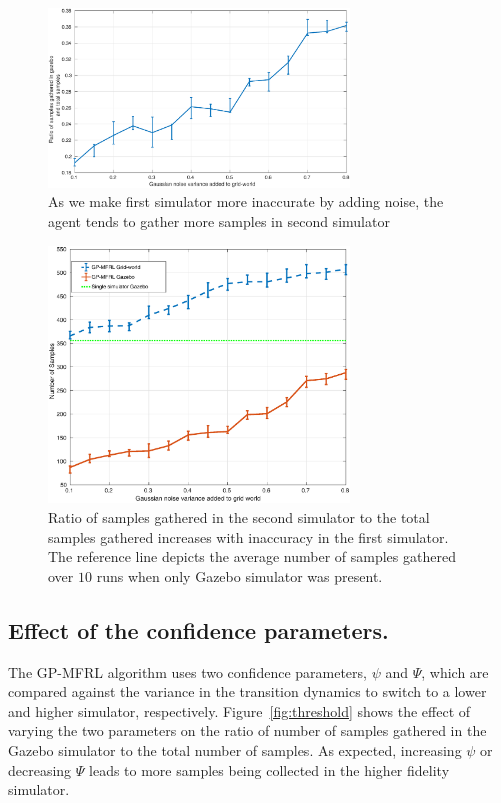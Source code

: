 \documentclass[12pt]{report}
\begin{document}
\begin{figure}[htp]
	\centering
	\includegraphics[width=8cm]{ratio.eps}
	\caption{As we make first simulator more inaccurate by adding noise, the agent tends to gather more samples in second simulator }
   \label{fig:gp_mfrl_samples}
\end{figure}

\begin{figure}[htp]
	\centering
	\includegraphics[width=8cm]{samples_gathered_.eps}
	\caption{Ratio of samples gathered in the second simulator to the total samples gathered increases with inaccuracy in the first simulator. The reference line depicts the average number of samples gathered over $10$ runs when only Gazebo simulator was present.}
   \label{fig:gp_mfrl_ratio}
\end{figure}

\subsection{Effect of the confidence parameters.}
The GP-MFRL algorithm uses two confidence parameters, $\psi$ and $\Psi$, which are compared against the variance in the transition dynamics to switch to a lower and higher simulator, respectively. Figure~\ref{fig:threshold} shows the effect of varying the two parameters on the ratio of number of samples gathered in the Gazebo simulator to the total number of samples. As expected, increasing $\psi$ or decreasing $\Psi$ leads to more samples being collected in the higher fidelity simulator. 
\end{document}
